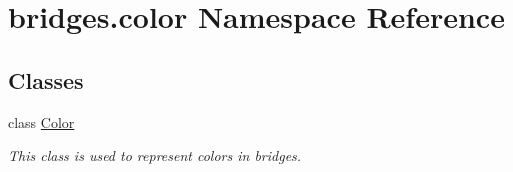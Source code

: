 \hypertarget{namespacebridges_1_1color}{}\section{bridges.\+color Namespace Reference}
\label{namespacebridges_1_1color}
\subsection*{Classes}
\begin{DoxyCompactItemize}
\item 
class \mbox{\hyperlink{classbridges_1_1color_1_1_color}{Color}}
\begin{DoxyCompactList}\small\item\em This class is used to represent colors in bridges. \end{DoxyCompactList}\end{DoxyCompactItemize}
